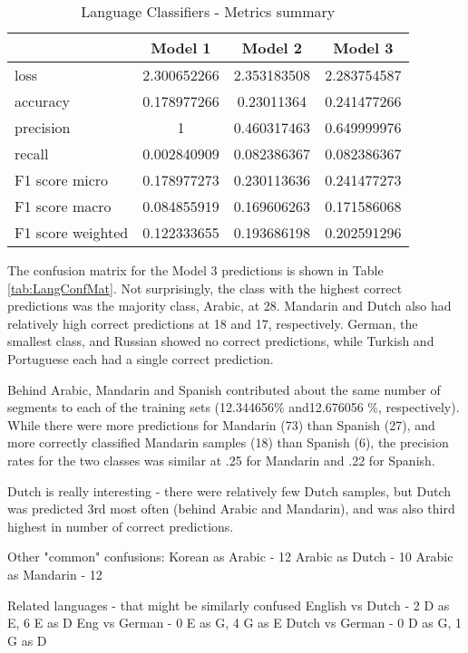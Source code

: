 \documentclass[11pt, letterpaper]{article}
\begin{document}
\begin{table}[h]
\begin{center}
\caption{Language Classifiers - Metrics summary}
\begin{tabular}{l c c c}
& 	Model 1 & Model 2 & Model 3\\ \hline
loss	&2.300652266 & 2.353183508 & 2.283754587 \\
accuracy& 0.178977266 & 0.23011364 &  0.241477266\\
precision & 1 & 0.460317463 & 0.649999976\\
recall & 0.002840909 & 0.082386367 & 0.082386367\\
F1 score micro & 0.178977273 & 0.230113636  & 0.241477273\\
F1 score macro & 0.084855919 & 0.169606263 & 0.171586068 \\
F1 score weighted & 0.122333655 & 0.193686198 & 0.202591296 \\
\end{tabular}
\label{tab:LangMetricsSum}
\end{center}
\end{table} 

The confusion matrix for the Model 3 predictions is shown in Table \ref{tab:LangConfMat}. Not surprisingly, the class with the highest correct predictions was the majority class, Arabic, at 28. Mandarin and Dutch also had relatively high correct predictions at 18 and 17, respectively. German, the smallest class, and Russian showed no correct predictions, while Turkish and Portuguese each had a single correct prediction.

Behind Arabic, Mandarin and Spanish contributed about the same number of segments to each of the training sets (12.344656\% and12.676056 \%, respectively). While there were more predictions for Mandarin (73) than Spanish (27), and more correctly classified Mandarin samples (18) than Spanish (6), the precision rates for the two classes was similar at .25 for Mandarin and .22 for Spanish.

Dutch is really interesting - there were relatively few Dutch samples, but Dutch was predicted 3rd most often (behind Arabic and Mandarin), and was also third highest in number of correct predictions.

Other "common" confusions:
Korean as Arabic - 12
Arabic as Dutch - 10
Arabic as Mandarin - 12

Related languages -  that might be similarly confused
English vs Dutch - 2 D as E, 6 E as D
Eng vs German - 0 E as G, 4 G as E
Dutch vs German - 0 D as G, 1 G as D
\end{document}
